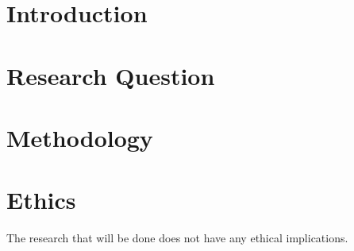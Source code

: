 \documentclass[A4]{article}
\begin{document}
\section{Introduction}

\section{Research Question}

\section{Methodology}

\section{Ethics}
The research that will be done does not have any ethical implications.



\end{document}
